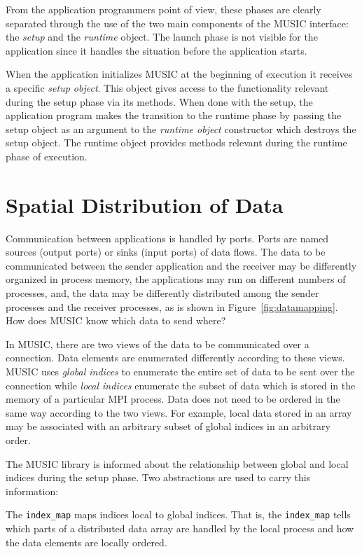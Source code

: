 \documentclass[a4paper]{report}
\begin{document}
From the application programmers point of view, these phases are
clearly separated through the use of the two main components of the
MUSIC interface: the \emph{setup} and the \emph{runtime} object.  The
launch phase is not visible for the application since it handles the
situation before the application starts.

When the application initializes MUSIC at the beginning of execution
it receives a specific \emph{setup object}.  This object gives access
to the functionality relevant during the setup phase via its methods.
When done with the setup, the application program makes the transition
to the runtime phase by passing the setup object as an argument to the
\emph{runtime object} constructor which destroys the setup object.
The runtime object provides methods relevant during the runtime phase
of execution.

\section{Spatial Distribution of Data}
\label{sec:spatialdist}

Communication between applications is handled by ports.  Ports are
named sources (output ports) or sinks (input ports) of data flows.
The data to be communicated between the sender application and the
receiver may be differently organized in process memory, the
applications may run on different numbers of processes, and, the data
may be differently distributed among the sender processes and the
receiver processes, as is shown in Figure~\ref{fig:datamapping}.  How
does MUSIC know which data to send where?

In MUSIC, there are two views of the data to be communicated over a
connection.  Data elements are enumerated differently according to
these views.  MUSIC uses \emph{global indices} to
enumerate the entire set of data to be sent over the connection while
\emph{local indices} enumerate the subset of data
which is stored in the memory of a particular MPI process.  Data does
not need to be ordered in the same way according to the two views.
For example, local data stored in an array may be associated with an
arbitrary subset of global indices in an arbitrary order.

The MUSIC library is informed about the relationship between global
and local indices during the setup phase.  Two abstractions are used
to carry this information:

The \lstinline|index_map| maps indices local to global indices.  That
is, the \lstinline|index_map| tells which parts of a distributed data
array are handled by the local process and how the data elements are
locally ordered.
\end{document}
